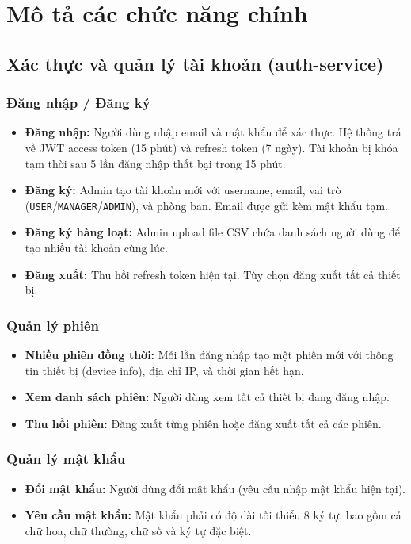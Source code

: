 \documentclass[12pt,a4paper]{report}
\begin{document}
\section{Mô tả các chức năng chính}

\subsection{Xác thực và quản lý tài khoản (auth-service)}

\subsubsection{Đăng nhập / Đăng ký}
\begin{itemize}
    \item \textbf{Đăng nhập:} Người dùng nhập email và mật khẩu để xác thực. Hệ thống trả về JWT access token (15 phút) và refresh token (7 ngày). Tài khoản bị khóa tạm thời sau 5 lần đăng nhập thất bại trong 15 phút.
    \item \textbf{Đăng ký:} Admin tạo tài khoản mới với username, email, vai trò (\texttt{USER}/\texttt{MANAGER}/\texttt{ADMIN}), và phòng ban. Email được gửi kèm mật khẩu tạm.
    \item \textbf{Đăng ký hàng loạt:} Admin upload file CSV chứa danh sách người dùng để tạo nhiều tài khoản cùng lúc.
    \item \textbf{Đăng xuất:} Thu hồi refresh token hiện tại. Tùy chọn đăng xuất tất cả thiết bị.
\end{itemize}

\subsubsection{Quản lý phiên}
\begin{itemize}
    \item \textbf{Nhiều phiên đồng thời:} Mỗi lần đăng nhập tạo một phiên mới với thông tin thiết bị (device info), địa chỉ IP, và thời gian hết hạn.
    \item \textbf{Xem danh sách phiên:} Người dùng xem tất cả thiết bị đang đăng nhập.
    \item \textbf{Thu hồi phiên:} Đăng xuất từng phiên hoặc đăng xuất tất cả các phiên.
\end{itemize}

\subsubsection{Quản lý mật khẩu}
\begin{itemize}
    \item \textbf{Đổi mật khẩu:} Người dùng đổi mật khẩu (yêu cầu nhập mật khẩu hiện tại).
    \item \textbf{Yêu cầu mật khẩu:} Mật khẩu phải có độ dài tối thiểu 8 ký tự, bao gồm cả chữ hoa, chữ thường, chữ số và ký tự đặc biệt.
\end{itemize}
\end{document}
